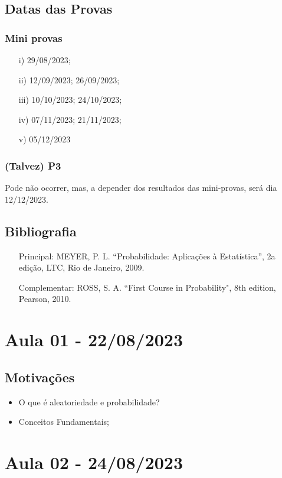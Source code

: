 \documentclass{article}
\begin{document}
\subsection*{Datas das Provas}
\subsubsection*{Mini provas}
\begin{itemize}
  \item[i)] 29/08/2023;
  \item[ii)] 12/09/2023; 26/09/2023;
  \item[iii)] 10/10/2023; 24/10/2023;
  \item[iv)] 07/11/2023; 21/11/2023;
  \item[v)] 05/12/2023
\end{itemize}
\subsubsection*{(Talvez) P3}
Pode não ocorrer, mas, a depender dos resultados das mini-provas, será dia 12/12/2023.
\subsection*{Bibliografia}
\begin{itemize}
  \item[Principal:] MEYER, P. L. ``Probabilidade: Aplicações à Estatística'', 2a edição, LTC, Rio de Janeiro, 2009.
  \item[Complementar:] ROSS, S. A. ``First Course in Probability", 8th edition, Pearson, 2010.
\end{itemize}

\newpage
\section{Aula 01 - 22/08/2023}
\subsection{Motivações}
\begin{itemize}
  \item O que é aleatoriedade e probabilidade?
  \item Conceitos Fundamentais;
\end{itemize}

\newpage

\section{Aula 02 - 24/08/2023}
\end{document}
